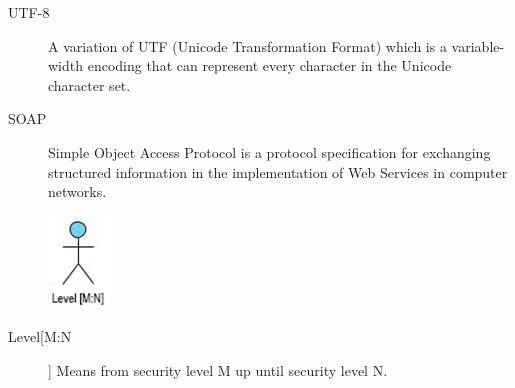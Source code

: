 \documentclass[10pt,a4paper]{article}
\begin{document}
\begin{description}
	\item[UTF-8] A variation of UTF (Unicode Transformation Format) which is a variable-width encoding that can represent every character in the Unicode character set.
	\item[SOAP] Simple Object Access Protocol is a protocol specification for exchanging structured information in the implementation of Web Services in computer networks.
	\pagebreak
	\begin{center}
	\includegraphics[scale=1.5]{GlossaryActor.jpg}
	\end{center}
	\item[Level[M:N]] Means from security level M up until security level N.
		
\end{description}
\end{document}

